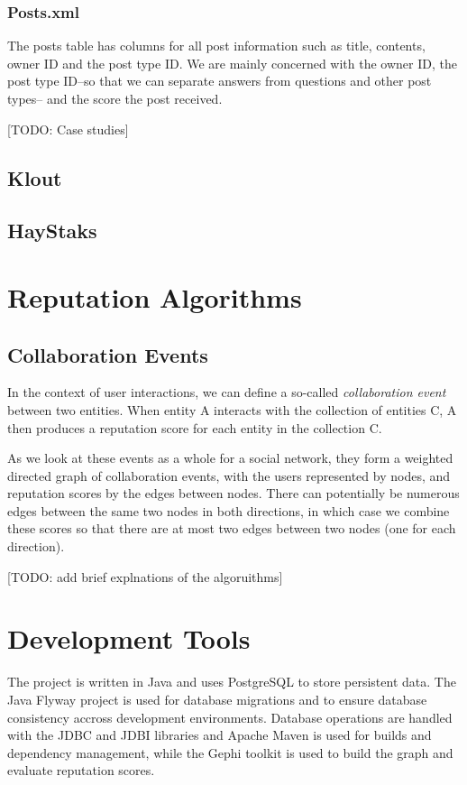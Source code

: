 \documentclass[]{final_report}
\begin{document}
\subsubsection{Posts.xml}
The posts table has columns for all post information such as title, contents, owner ID and the post type ID. We are mainly concerned with the owner ID, the post type ID--so that we can separate answers from questions and other post types-- and the score the post received. 

[TODO: Case studies]
\subsection{Klout}
\subsection{HayStaks}
\section{Reputation Algorithms}
\subsection{Collaboration Events}

In the context of user interactions, we can define a so-called \textsl{collaboration event} between two entities. When entity A interacts with the collection of entities C, A then produces a reputation score for each entity in the collection C.

As we look at these events as a whole for a social network, they form a weighted directed graph of collaboration events, with the users represented by nodes, and reputation scores by the edges between nodes. There can potentially be numerous edges between the same two nodes in both directions, in which case we combine these scores so that there are at most two edges between two nodes (one for each direction).

[TODO: add brief explnations of the algoruithms]

\section{Development Tools}
The project is written in Java and uses PostgreSQL to store persistent data. The Java Flyway project is used for database migrations and to ensure database consistency accross development environments. Database operations are handled with the JDBC and JDBI libraries and Apache Maven is used for builds and dependency management, while the Gephi toolkit is used to build the graph and evaluate reputation scores.
\end{document}
